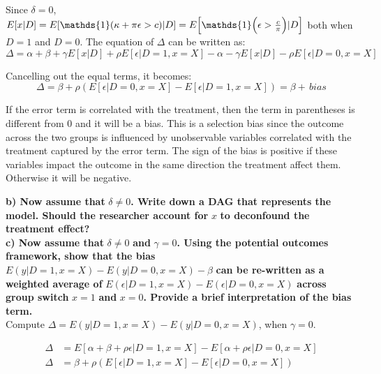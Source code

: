 \documentclass[a4paper,12pt,oneside,English]{article}
\begin{document}
Since $\delta=0$, $E[x|D]=E[\mathds{1}(\kappa+\pi\epsilon>c)|D]=E\Bigl[\mathds{1}\Bigl(\epsilon>\frac{c}{\pi}\Bigr)|D\Bigr]$ both when $D=1$ and $D=0$. The equation of $\Delta$ can be written as:
\begin{equation}
    \Delta=\alpha+\beta+\gamma E[x|D] + \rho E[\epsilon|D=1, x=X]-\alpha-\gamma E[x|D]-\rho E[\epsilon|D=0, x=X]
\end{equation}

Cancelling out the equal terms, it becomes:
\begin{equation}
    \Delta=\beta+\rho (E[\epsilon|D=0,x=X]-E[\epsilon|D=1,x=X])=\beta+\,bias
\end{equation}

If the error term is correlated with the treatment, then the term in parentheses is different from 0 and it will be a bias. This is a selection bias since the outcome across the two groups is influenced by unobservable variables correlated with the treatment captured by the error term. The sign of the bias is positive if these variables impact the outcome in the same direction the treatment affect them. Otherwise it will be negative.

\textbf{b) Now assume that }$\delta \neq 0$\textbf{. Write down a DAG that represents the model. Should the researcher account for }$x$ \textbf{to deconfound the treatment effect?}\\

\textbf{c) Now assume that }$\delta \not= 0$ \textbf{and} $\gamma = 0$\textbf{. Using the potential outcomes framework, show that the bias} $E(y|D = 1,x = X) - E(y|D = 0,x = X) - \beta$ \textbf{can be re-written as a weighted average of} $E(\epsilon|D=1,x=X)-E(\epsilon|D=0,x=X)$ \textbf{across group switch }$x=1$ \textbf{and} $x=0$\textbf{. Provide a brief interpretation of the bias term.}\\

Compute $\Delta=E(y|D = 1,x = X) - E(y|D = 0,x = X)$, when $\gamma=0$.

\begin{equation}
\label{eq_parent}
\begin{split}
    \Delta &= E[\alpha + \beta + \rho\epsilon | D=1, x=X] - E[\alpha + \rho\epsilon | D=0, x=X]\\
    \Delta &= \beta + \rho(E[\epsilon|D=1, x=X]-E[\epsilon|D=0, x=X])
\end{split}
\end{equation}
\end{document}
